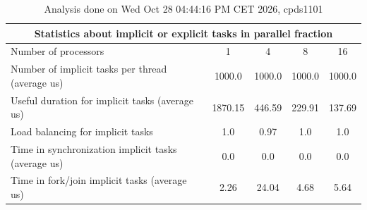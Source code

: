\begin{table}[h]
\begin{center}
\begin{tabular}{|l|c|c|c|c|}
\hline
\multicolumn{5}{|c|}{Statistics about implicit or explicit tasks in parallel fraction} \\
\hline
\hline
Number of processors & 1 & 4 & 8 & 16 \\
\hline
\hline
Number of implicit tasks per thread (average us)    &          1000.0 &          1000.0 &          1000.0 &          1000.0 \\
\hline
Useful duration for implicit tasks (average us)     &         1870.15 &          446.59 &          229.91 &          137.69 \\
\hline
Load balancing for implicit tasks                &             1.0 &            0.97 &             1.0 &             1.0 \\
\hline
Time in synchronization implicit tasks (average us) &             0.0 &             0.0 &             0.0 &             0.0 \\
\hline
Time in fork/join implicit tasks (average us)       &            2.26 &           24.04 &            4.68 &            5.64 \\
\hline
\end{tabular}
\end{center}
\caption{ Analysis done on Wed Oct 28 04:44:16 PM CET 2026, cpds1101}
\end{table}
